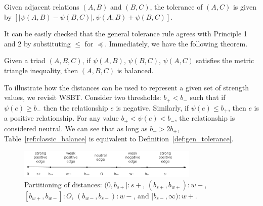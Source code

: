 


\begin{definition} \label{def:gen_tolerance}
Given adjacent relations $(A,B)$ and $(B,C)$, the tolerance of $(A,C)$
is given by $[|\psi(A,B)-\psi(B,C)|, \psi(A,B)+\psi(B,C)]$.
\end{definition}

It can be easily checked that the general tolerance rule agrees with
Principle 1 and 2 by substituting $\leq$ for $\preceq$.  Immediately, we have the following
theorem.
\begin{theorem} 
Given a triad $(A,B,C)$, if $\psi(A,B)$, $\psi(B,C)$, $\psi(A,C)$
satisfies the metric triangle inequality, then $(A,B,C)$ is balanced.
\end{theorem}

To illustrate how the distances can be used to represent a given set
of strength values, we revisit WSBT. Consider two thresholds:
$b_{+} < b_{-}$ such that if $\psi(e)\geq b_{-}$ then the relationship
$e$ is negative. Similarly, if $\psi(e)\leq b_{+}$, then $e$ is
a positive relationship. For any value $b_{+} < \psi(e) < b_{-}$, the
relationship is considered neutral. We can see that as long as
$b_{-}>2b_{+}$, Table~\ref{ref:classic_balance} is equivalent to
Definition~\ref{def:gen_tolerance}.

\begin{figure}[th]
\centering
\includegraphics[height=0.55in]{Figs/mapping2.pdf}
\vspace*{-0.1in}
\caption{\label{fig:partition}Partitioning of distances:
  $(0,b_{s+}]:s+$, $(b_{s+}, b_{w+}): w-$, $[b_{w+}, b_{w-}]:O$,
$(b_{w-}, b_{s-}):w-$, and $ [b_{s-}, \infty):w+$.}

\end{figure}

